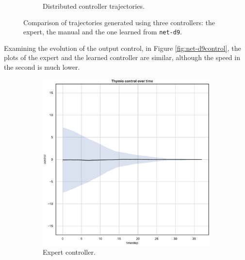 \begin{figure}[H]
\begin{center}
\begin{subfigure}[h]{0.49\textwidth}
			\caption{Distributed controller trajectories.}
		\end{subfigure}
	\end{center}
	\caption[Evaluation of the trajectories learned by 
	\texttt{net-d9}.]{Comparison of trajectories generated using three controllers: 
	the expert, the manual and the one learned from \texttt{net-d9}.}
	\label{fig:net-d9traj}
\end{figure}

Examining the evolution of the output control, in Figure \ref{fig:net-d9control}, 
the plots of the expert and the learned controller are similar, although the speed 
in the second is much lower.
\begin{figure}[!htb]
	\centering
	\begin{subfigure}[h]{0.3\textwidth}
		\centering
		\includegraphics[width=\textwidth]{contents/images/net-d9/control-overtime-omniscient}%
		\caption{Expert controller.}
	\end{subfigure}
	\hfill
	\begin{subfigure}[h]{0.3\textwidth}
		\centering

\end{subfigure}
\end{figure}
